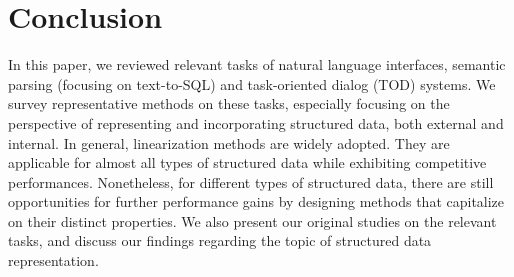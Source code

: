 \documentclass[11pt,dvipdfm]{article}
\begin{document}
\begin{table}[t]
\centering
\caption{Exact match plotting performance.}
\label{tbl:chartdialogs-res}
\end{table}


\section{Conclusion}
In this paper, we reviewed relevant tasks of natural language interfaces, semantic parsing (focusing on text-to-SQL) and task-oriented dialog (TOD) systems. We survey representative methods on these tasks, especially focusing on the perspective of representing and incorporating structured data, both external and internal. In general, linearization methods are widely adopted. They are applicable for almost all types of structured data while exhibiting competitive performances. Nonetheless, for  different types of structured data, there are still opportunities for further performance gains by designing methods that capitalize on their distinct properties.
We also present our original studies on the relevant tasks, and discuss our findings regarding the topic of structured data representation.
\end{document}
